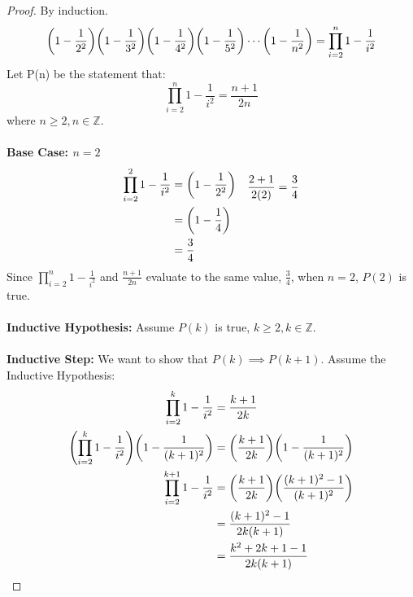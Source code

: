 \documentclass[article,12pt]{article}
\DeclarePairedDelimiter\paren{(}{)} %
\newcommand{\df}{\displaystyle\frac} %
\newcommand{\ints}{\mathbb{Z}}
\begin{document}
\begin{proof} By induction. \\
    \[ \paren*{1-\df1{2^2}}\paren*{1-\df1{3^2}}\paren*{1-\df1{4^2}}\paren*{1-\df1{5^2}}\cdots \paren*{1-\df1{n^2}} = \prod_{i=2}^{n}{1 - \frac{1}{i^2}} \]
    Let P(n) be the statement that:
    \[ \prod_{i=2}^{n}{1 - \frac{1}{i^2}} = \frac{n+1}{2n}\]
    where $n \geq 2, n \in \ints$. \\
    \\
    \textbf{Base Case: $n=2$}
    \begin{align*}
        \begin{aligned}
            \prod_{i=2}^{2}{1-\frac{1}{i^2}} &= \paren*{1 - \frac{1}{2^2}} \\
                                         &= \paren*{1 - \frac{1}{4}} \\
                                         &= \frac{3}{4}
        \end{aligned}
        &&
        \begin{aligned}
            \frac{2+1}{2(2)} &= \frac{3}{4} \\
            \\
            \\
            \\
        \end{aligned}
    \end{align*}
    Since $\displaystyle\prod_{i=2}^{n}{1-\frac{1}{i^2}}$ and $\df{n+1}{2n}$ evaluate to the same value, $\df{3}{4}$, when $n=2$, $P(2)$ is true. \\
    \\
    \textbf{Inductive Hypothesis:} Assume $P(k)$ is true, $k \geq 2, k \in \ints$. \\
    \\
    \textbf{Inductive Step:} We want to show that $P(k) \implies P(k+1)$. Assume the Inductive Hypothesis:
    \begin{align*}
        \prod_{i=2}^{k}{1-\frac{1}{i^2}} &= \frac{k+1}{2k} \\
        \paren*{\prod_{i=2}^{k}{1-\frac{1}{i^2}}}\paren*{1-\frac{1}{(k+1)^2}} &= \paren*{\frac{k+1}{2k}}\paren*{1-\frac{1}{(k+1)^2}} \\
        \prod_{i=2}^{k+1}{1-\frac{1}{i^2}} &= \paren*{\frac{k+1}{2k}}\paren*{\frac{(k+1)^2 - 1}{(k+1)^2}} \\
                                           &= \frac{(k+1)^2 - 1}{2k(k+1)} \\
                                           &= \frac{k^2 + 2k + 1 - 1}{2k(k+1)} \\

\end{align*}
\end{proof}
\end{document}
